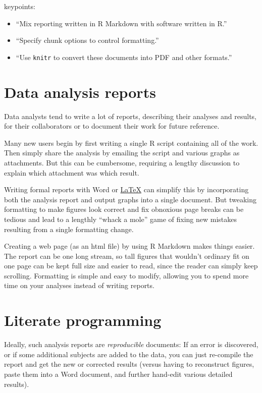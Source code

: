 \documentclass[]{book}
\providecommand{\tightlist}{%
  \setlength{\itemsep}{0pt}\setlength{\parskip}{0pt}}
\begin{document}
keypoints:

\begin{itemize}
\tightlist
\item
  ``Mix reporting written in R Markdown with software written in R.''\\
\item
  ``Specify chunk options to control formatting.''\\
\item
  ``Use \texttt{knitr} to convert these documents into PDF and other
  formats.''
\end{itemize}

\section{Data analysis reports}\label{data-analysis-reports}

Data analysts tend to write a lot of reports, describing their analyses
and results, for their collaborators or to document their work for
future reference.

Many new users begin by first writing a single R script containing all
of the work. Then simply share the analysis by emailing the script and
various graphs as attachments. But this can be cumbersome, requiring a
lengthy discussion to explain which attachment was which result.

Writing formal reports with Word or
\href{http://www.latex-project.org/}{LaTeX} can simplify this by
incorporating both the analysis report and output graphs into a single
document. But tweaking formatting to make figures look correct and fix
obnoxious page breaks can be tedious and lead to a lengthly ``whack a
mole'' game of fixing new mistakes resulting from a single formatting
change.

Creating a web page (as an html file) by using R Markdown makes things
easier. The report can be one long stream, so tall figures that wouldn't
ordinary fit on one page can be kept full size and easier to read, since
the reader can simply keep scrolling. Formatting is simple and easy to
modify, allowing you to spend more time on your analyses instead of
writing reports.

\section{Literate programming}\label{literate-programming}

Ideally, such analysis reports are \emph{reproducible} documents: If an
error is discovered, or if some additional subjects are added to the
data, you can just re-compile the report and get the new or corrected
results (versus having to reconstruct figures, paste them into a Word
document, and further hand-edit various detailed results).
\end{document}
